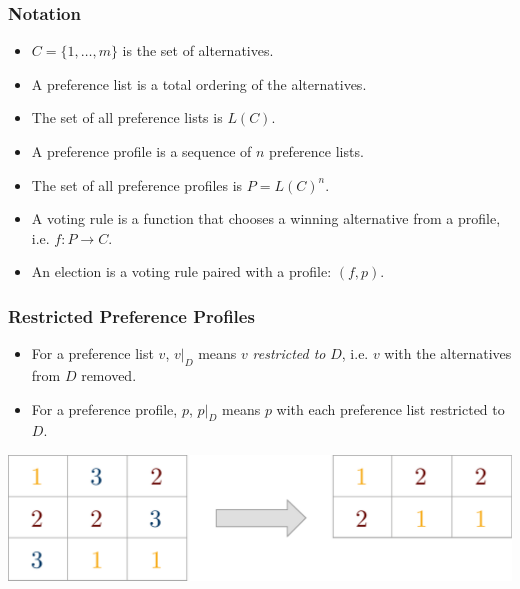 \documentclass[aspectratio=169]{beamer}
\begin{document}
		\begin{frame}
			\frametitle{Notation}
			\begin{itemize}
				\item $C = \{1, \ldots, m\}$ is the set of alternatives.
				\item A preference list is a total ordering of the alternatives.
				\item The set of all preference lists is $L(C)$.
				\item A preference profile is a sequence of $n$ preference lists.
				\item The set of all preference profiles is $P = L(C)^n$.
				\item A voting rule is a function that chooses a winning alternative from a profile, i.e. $f : P \to C$.
				\item An election is a voting rule paired with a profile: $(f, p)$.
			\end{itemize}

		\end{frame}

		\begin{frame}
			\frametitle{Restricted Preference Profiles}
			\begin{itemize}
				\item For a preference list $v$, $v|_D$ means $v$ \emph{restricted to} $D$, i.e. $v$ with the alternatives from $D$ removed.
				\item For a preference profile, $p$, $p|_D$ means $p$ with each preference list restricted to $D$.
			\end{itemize}

			\hspace*{3.5cm}{\Large $p$}\hspace{6.2cm}{\Large $p|_{\{1, 2\}}$}

			\vspace{.5em}
			\centerline{\includegraphics[height=0.3\paperheight, keepaspectratio]{../figures/restriction_example.pdf}}
		\end{frame}
\end{document}
